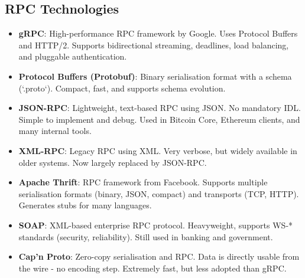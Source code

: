 \documentclass[10pt,a4paper]{article}
\begin{document}
\subsection*{RPC Technologies}
\begin{itemize}
    \item \textbf{gRPC}: High-performance RPC framework by Google. Uses Protocol Buffers and HTTP/2. Supports bidirectional streaming, deadlines, load balancing, and pluggable authentication.
    \item \textbf{Protocol Buffers (Protobuf)}: Binary serialisation format with a schema (`.proto`). Compact, fast, and supports schema evolution.
    \item \textbf{JSON-RPC}: Lightweight, text-based RPC using JSON. No mandatory IDL. Simple to implement and debug. Used in Bitcoin Core, Ethereum clients, and many internal tools.
    \item \textbf{XML-RPC}: Legacy RPC using XML. Very verbose, but widely available in older systems. Now largely replaced by JSON-RPC.
    \item \textbf{Apache Thrift}: RPC framework from Facebook. Supports multiple serialisation formats (binary, JSON, compact) and transports (TCP, HTTP). Generates stubs for many languages.
    \item \textbf{SOAP}: XML-based enterprise RPC protocol. Heavyweight, supports WS-* standards (security, reliability). Still used in banking and government.
    \item \textbf{Cap’n Proto}: Zero-copy serialisation and RPC. Data is directly usable from the wire - no encoding step. Extremely fast, but less adopted than gRPC.
\end{itemize}
\end{document}
